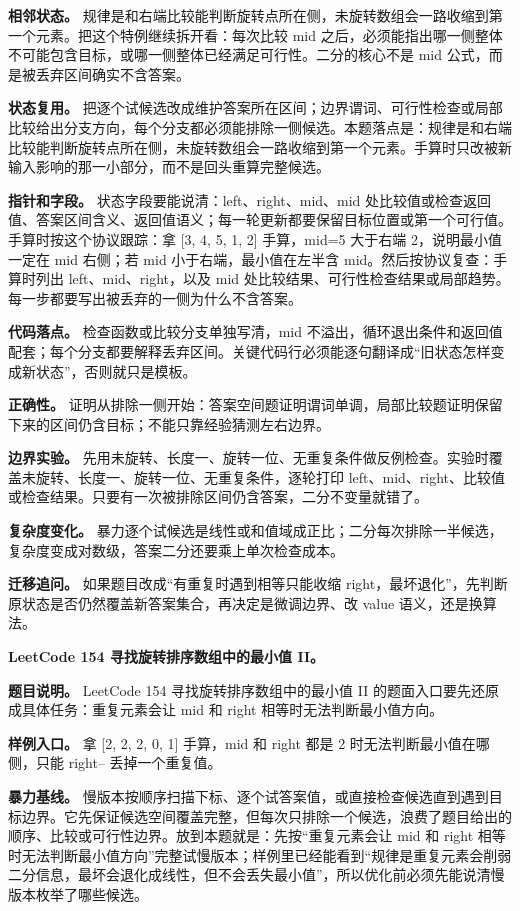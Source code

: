 \textbf{相邻状态。} 规律是和右端比较能判断旋转点所在侧，未旋转数组会一路收缩到第一个元素。把这个特例继续拆开看：每次比较 mid 之后，必须能指出哪一侧整体不可能包含目标，或哪一侧整体已经满足可行性。二分的核心不是 mid 公式，而是被丢弃区间确实不含答案。

\textbf{状态复用。} 把逐个试候选改成维护答案所在区间；边界谓词、可行性检查或局部比较给出分支方向，每个分支都必须能排除一侧候选。本题落点是：规律是和右端比较能判断旋转点所在侧，未旋转数组会一路收缩到第一个元素。手算时只改被新输入影响的那一小部分，而不是回头重算完整候选。

\textbf{指针和字段。} 状态字段要能说清：left、right、mid、mid 处比较值或检查返回值、答案区间含义、返回值语义；每一轮更新都要保留目标位置或第一个可行值。手算时按这个协议跟踪：拿 [3, 4, 5, 1, 2] 手算，mid=5 大于右端 2，说明最小值一定在 mid 右侧；若 mid 小于右端，最小值在左半含 mid。然后按协议复查：手算时列出 left、mid、right，以及 mid 处比较结果、可行性检查结果或局部趋势。每一步都要写出被丢弃的一侧为什么不含答案。

\textbf{代码落点。} 检查函数或比较分支单独写清，mid 不溢出，循环退出条件和返回值配套；每个分支都要解释丢弃区间。关键代码行必须能逐句翻译成“旧状态怎样变成新状态”，否则就只是模板。

\textbf{正确性。} 证明从排除一侧开始：答案空间题证明谓词单调，局部比较题证明保留下来的区间仍含目标；不能只靠经验猜测左右边界。

\textbf{边界实验。} 先用未旋转、长度一、旋转一位、无重复条件做反例检查。实验时覆盖未旋转、长度一、旋转一位、无重复条件，逐轮打印 left、mid、right、比较值或检查结果。只要有一次被排除区间仍含答案，二分不变量就错了。

\textbf{复杂度变化。} 暴力逐个试候选是线性或和值域成正比；二分每次排除一半候选，复杂度变成对数级，答案二分还要乘上单次检查成本。

\textbf{迁移追问。} 如果题目改成“有重复时遇到相等只能收缩 right，最坏退化”，先判断原状态是否仍然覆盖新答案集合，再决定是微调边界、改 value 语义，还是换算法。

\noindent\textbf{LeetCode 154 寻找旋转排序数组中的最小值 II。}

\textbf{题目说明。} LeetCode 154 寻找旋转排序数组中的最小值 II 的题面入口要先还原成具体任务：重复元素会让 mid 和 right 相等时无法判断最小值方向。

\textbf{样例入口。} 拿 [2, 2, 2, 0, 1] 手算，mid 和 right 都是 2 时无法判断最小值在哪侧，只能 right-- 丢掉一个重复值。

\textbf{暴力基线。} 慢版本按顺序扫描下标、逐个试答案值，或直接检查候选直到遇到目标边界。它先保证候选空间覆盖完整，但每次只排除一个候选，浪费了题目给出的顺序、比较或可行性边界。放到本题就是：先按“重复元素会让 mid 和 right 相等时无法判断最小值方向”完整试慢版本；样例里已经能看到“规律是重复元素会削弱二分信息，最坏会退化成线性，但不会丢失最小值”，所以优化前必须先能说清慢版本枚举了哪些候选。


